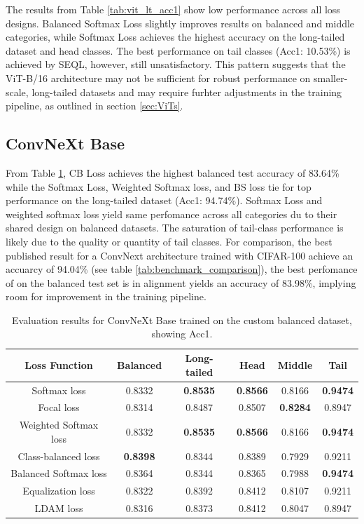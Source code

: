 The results from Table \ref{tab:vit_lt_acc1} show low performance across all loss designs. Balanced Softmax Loss slightly improves results on balanced and middle categories, while Softmax Loss achieves the highest accuracy on the long-tailed dataset and head classes. The best performance on tail classes (Acc1: 10.53\%) is achieved by SEQL, however, still unsatisfactory. This pattern suggests that the ViT-B/16 architecture may not be sufficient for robust performance on smaller-scale, long-tailed datasets and may require furhter adjustments in the training pipeline, as outlined in section \ref{sec:ViTs}. 

\subsection{ConvNeXt Base}
From Table \ref{tab:conv_bal_acc1_1}, CB Loss achieves the highest balanced test accuracy of 83.64\% while the Softmax Loss, Weighted Softmax loss, and BS loss tie for top performance on the long-tailed dataset (Acc1: 94.74\%). Softmax Loss and weighted softmax loss yield same perfomance across all categories du to their shared design on balanced datasets. The saturation of tail-class performance is likely due to the quality or quantity of tail classes. For comparison, the best published result for a ConvNext architecture trained with CIFAR-100 achieve an accuarcy of 94.04\% (see table \ref{tab:benchmark_comparison}), the best perfomance of on the balanced test set is in alignment yields an accuracy of 83.98\%, implying room for improvement in the training pipeline.

\begin{table}[h!]
    \centering
    \caption{Evaluation results for ConvNeXt Base trained on the custom balanced dataset, showing Acc1.}
    \begin{tabular}{cccccc}
        \toprule
        Loss Function & Balanced & Long-tailed & Head & Middle & Tail \\ 
        \midrule
        Softmax loss   & 0.8332 & \textbf{0.8535} & \textbf{0.8566} & 0.8166 & \textbf{0.9474} \\
        Focal loss   & 0.8314 & 0.8487 & 0.8507 & \textbf{0.8284} & 0.8947 \\
        Weighted Softmax loss   & 0.8332 & \textbf{0.8535} & \textbf{0.8566} &  0.8166 & \textbf{0.9474} \\
        Class-balanced loss   & \textbf{0.8398} & 0.8344 & 0.8389 & 0.7929 & 0.9211 \\
        Balanced Softmax loss   & 0.8364 & 0.8344 & 0.8365 & 0.7988 & \textbf{0.9474} \\
        Equalization loss   & 0.8322 & 0.8392 & 0.8412 & 0.8107 & 0.9211 \\
        LDAM loss   & 0.8316 & 0.8373 & 0.8412 & 0.8047 & 0.8947 \\
        \bottomrule
    \end{tabular}
    \label{tab:conv_bal_acc1_1}
\end{table}


